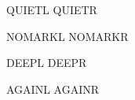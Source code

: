 
\GlossPhantomAlign


\noindent QUIETL  QUIETR

{\renewcommand\AltJdgTuck{40pt}
\noindent NOMARKL  NOMARKR\par}

{\renewcommand\AltJdgTuck{18pt}
\noindent DEEPL  DEEPR\par}

{\renewcommand\AltJdgTuck{22pt}
\noindent AGAINL  AGAINR\par}

